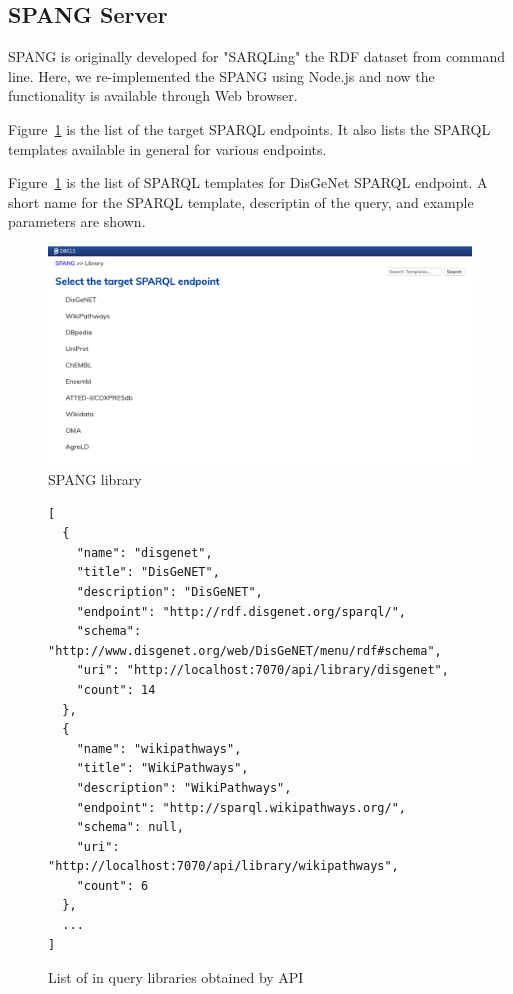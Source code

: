 \documentclass[runningheads]{llncs}
\begin{document}
\subsection{SPANG Server}
SPANG is originally developed for "SARQLing" the RDF dataset from command line. Here, we re-implemented the SPANG using Node.js and now the functionality is available through Web browser. 


Figure~\ref{fig:spang_lib} is the list of the target SPARQL endpoints. It also lists the SPARQL templates available in general for various endpoints.

Figure~\ref{fig:spang_lib} is the list of SPARQL templates for DisGeNet SPARQL endpoint.
A short name for the SPARQL template, descriptin of the query, and example parameters are shown.


\begin{figure}
\center
\includegraphics[width=1.0\textwidth]{spang_lib.png}
\caption{SPANG library}
\label{fig:spang_lib}
\end{figure}


\begin{figure}[!t]
\begin{scriptsize}
\begin{verbatim}
[
  {
    "name": "disgenet",
    "title": "DisGeNET",
    "description": "DisGeNET",
    "endpoint": "http://rdf.disgenet.org/sparql/",
    "schema": "http://www.disgenet.org/web/DisGeNET/menu/rdf#schema",
    "uri": "http://localhost:7070/api/library/disgenet",
    "count": 14
  },
  {
    "name": "wikipathways",
    "title": "WikiPathways",
    "description": "WikiPathways",
    "endpoint": "http://sparql.wikipathways.org/",
    "schema": null,
    "uri": "http://localhost:7070/api/library/wikipathways",
    "count": 6
  },
  ...
]
\end{verbatim}
\end{scriptsize}
\caption{List of in query libraries obtained by API}
\label{fig:libs-api-out}
\end{figure}
\end{document}
